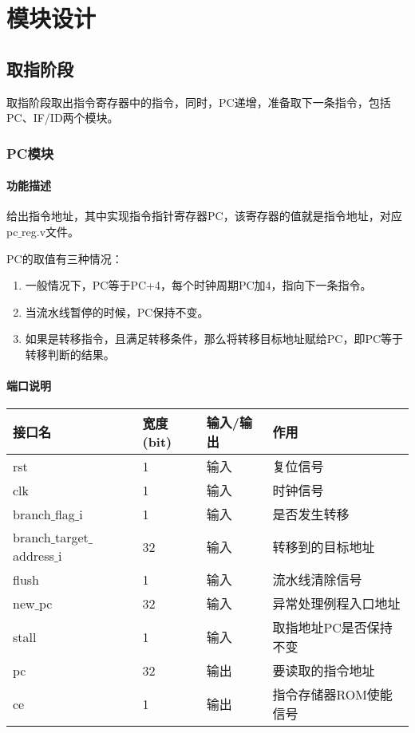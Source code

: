 \section{模块设计}
\subsection{取指阶段}
取指阶段取出指令寄存器中的指令，同时，PC递增，准备取下一条指令，包括PC、IF/ID两个模块。
\subsubsection{PC模块}
\paragraph{功能描述}
\quad

\quad

给出指令地址，其中实现指令指针寄存器PC，该寄存器的值就是指令地址，对应pc$\_$reg.v文件。

PC的取值有三种情况：
\begin{enumerate}[(1)]
	\item 一般情况下，PC等于PC+4，每个时钟周期PC加4，指向下一条指令。
	
	\item 当流水线暂停的时候，PC保持不变。
	
	\item 如果是转移指令，且满足转移条件，那么将转移目标地址赋给PC，即PC等于转移判断的结果。
\end{enumerate}
\paragraph{端口说明}
\quad

\quad
	\begin{longtable}{|l|l|l|l|}
		\hline
		接口名 & 宽度(bit) & 输入/输出 & 作用 \\
		\hline
		rst & 1 & 输入 & 复位信号 \\
		\hline
		clk & 1 & 输入 & 时钟信号 \\
		\hline
		branch$\_$flag$\_$i & 1 & 输入 & 是否发生转移 \\
		\hline
		branch$\_$target$\_$address$\_$i & 32 & 输入 & 转移到的目标地址 \\
		\hline
		flush & 1 & 输入 & 流水线清除信号 \\
		\hline
		new$\_$pc & 32 & 输入 & 异常处理例程入口地址 \\
		\hline
		stall & 1 & 输入 & 取指地址PC是否保持不变 \\
		\hline
		pc & 32 & 输出 & 要读取的指令地址 \\
		\hline
		ce & 1 & 输出 & 指令存储器ROM使能信号 \\
		\hline
	\end{longtable}
